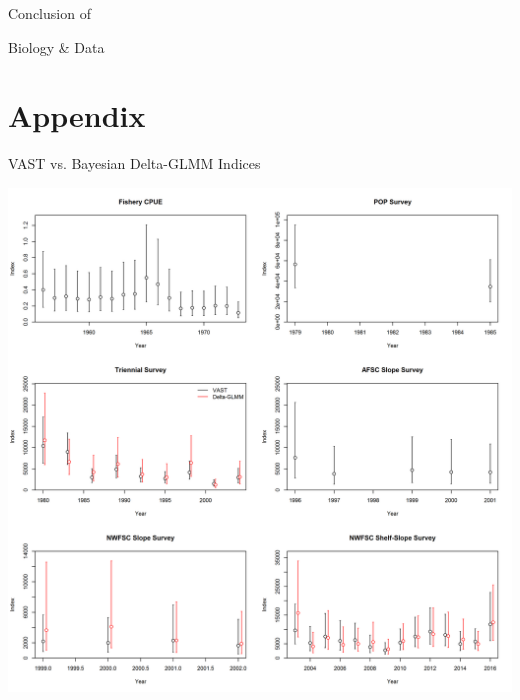 \documentclass[pdf]{beamer}\usepackage[]{graphicx}\usepackage[]{color}
\begin{document}
\begin{frame}
  \Huge{\centerline{Conclusion of}}
  \Huge{\centerline{Biology \& Data}}
\end{frame}

\section*{Appendix}
\begin{frame}{VAST vs. Bayesian Delta-GLMM Indices}
  \begin{center}
    \includegraphics[scale = 0.30]{figures/Index_Comparison.png}
  \end{center}
\end{frame}  
\end{document}
